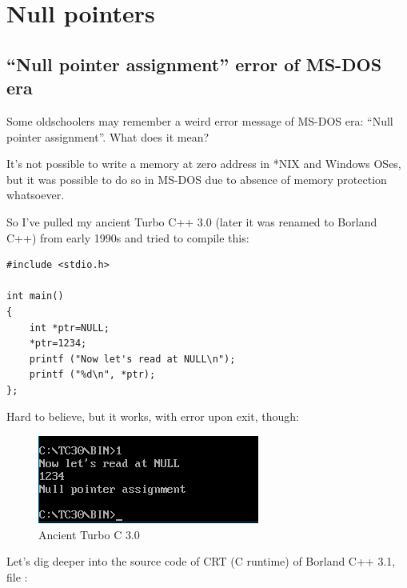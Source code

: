\section{Null pointers}

\subsection{``Null pointer assignment'' error of MS-DOS era}

Some oldschoolers may remember a weird error message of MS-DOS era: ``Null pointer assignment''.
What does it mean?

It's not possible to write a memory at zero address in *NIX and Windows OSes, but it was possible to do so in MS-DOS due to absence of memory protection whatsoever.

So I've pulled my ancient Turbo C++ 3.0 (later it was renamed to Borland C++) from early 1990s and tried to compile this:

\begin{lstlisting}
#include <stdio.h>

int main()
{
	int *ptr=NULL;
	*ptr=1234;
	printf ("Now let's read at NULL\n");
	printf ("%d\n", *ptr);
};
\end{lstlisting}

Hard to believe, but it works, with error upon exit, though:

\begin{figure}[H]
	\centering
	\includegraphics[scale=\NormalScale]{advanced/450_more_ptrs/tc30.png}
	\caption{Ancient Turbo C 3.0}
\end{figure}

Let's dig deeper into the source code of CRT (C runtime) of Borland C++ 3.1, file :

